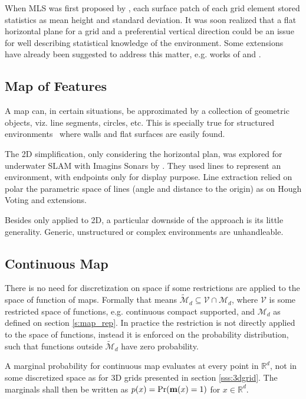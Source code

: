 When MLS was first proposed by \citet{triebel2006multi}, each surface patch of
each grid element stored statistics as mean height and standard deviation. It
was soon realized that a flat horizontal plane for a grid and a preferential
vertical direction could be an issue for well describing statistical knowledge
of the environment. Some extensions have already been suggested to address this
matter, e.g. works of \citet{rivadeneyra2011probabilistic} and
\citet{Schwendner2013}.

\subsection{Map of Features}
\label{ss:mapsoffeatures}
A map can, in certain situations, be approximated by a collection of geometric
objects, viz. line segments, circles, etc. This is specially true for structured
environments~\cite{Ribas2006} where walls and flat surfaces are easily found.

The 2D simplification, only considering the horizontal plan, was explored for
underwater SLAM with Imagins Sonars by \citet{ribas2010underwater}. They used
lines to represent an environment, with endpoints only for display purpose. Line
extraction relied on polar the parametric space of lines (angle and distance to
the origin) as on Hough Voting and extensions.

Besides only applied to 2D, a particular downside of the approach is its little
generality. Generic, unstructured or complex environments are unhandleable.


\subsection{Continuous Map}

There is no need for discretization on space if some restrictions are applied to
the space of function of maps. Formally that means
$\tilde{\mathcal{M}}_d\subseteq\mathcal{V}\cap\mathcal{M}_d$, where $\mathcal{V}$
is some restricted space of functions, e.g. continuous compact supported, and
$\mathcal{M}_d$ as defined on section \ref{s:map_rep}. In practice the
restriction is not directly applied to the space of functions, instead it is
enforced on the probability distribution, such that functions outside
$\tilde{\mathcal{M}}_d$ have zero probability.

A marginal probability for continuous map evaluates at every point in
$\mathbb{R}^d$, not in some discretized space as for 3D grids presented in
section \ref{sss:3dgrid}. The marginals shall then be written as
$p(x)=\Pr(\mathrm{\mathbf{m}}(x)=1)$ for $x\in\mathbb{R}^d$.

